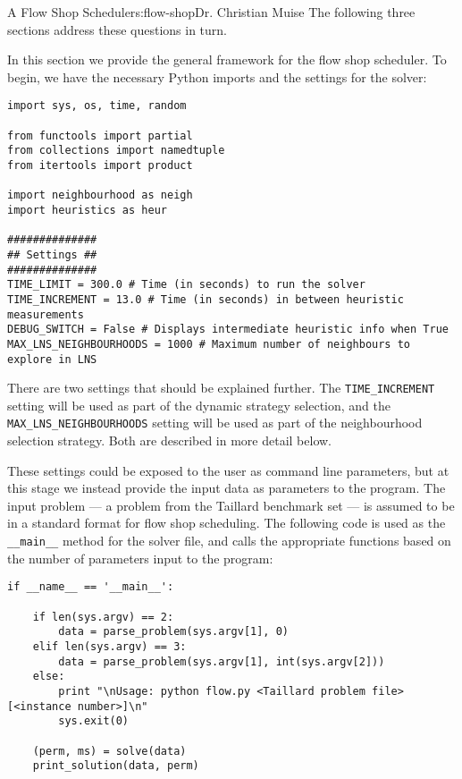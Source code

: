 \begin{aosachapter}{A Flow Shop Scheduler}{s:flow-shop}{Dr. Christian Muise}
The following three sections address these questions in turn.

\label{general-solver}

In this section we provide the general framework for the flow shop
scheduler. To begin, we have the necessary Python imports and the
settings for the solver:

\begin{verbatim}
import sys, os, time, random

from functools import partial
from collections import namedtuple
from itertools import product

import neighbourhood as neigh
import heuristics as heur

##############
## Settings ##
##############
TIME_LIMIT = 300.0 # Time (in seconds) to run the solver
TIME_INCREMENT = 13.0 # Time (in seconds) in between heuristic measurements
DEBUG_SWITCH = False # Displays intermediate heuristic info when True
MAX_LNS_NEIGHBOURHOODS = 1000 # Maximum number of neighbours to explore in LNS
\end{verbatim}

There are two settings that should be explained further. The
\texttt{TIME\_INCREMENT} setting will be used as part of the dynamic
strategy selection, and the \texttt{MAX\_LNS\_NEIGHBOURHOODS} setting
will be used as part of the neighbourhood selection strategy. Both are
described in more detail below.

These settings could be exposed to the user as command line parameters,
but at this stage we instead provide the input data as parameters to the
program. The input problem --- a problem from the Taillard benchmark set
--- is assumed to be in a standard format for flow shop scheduling. The
following code is used as the \texttt{\_\_main\_\_} method for the
solver file, and calls the appropriate functions based on the number of
parameters input to the program:

\begin{verbatim}
if __name__ == '__main__':

    if len(sys.argv) == 2:
        data = parse_problem(sys.argv[1], 0)
    elif len(sys.argv) == 3:
        data = parse_problem(sys.argv[1], int(sys.argv[2]))
    else:
        print "\nUsage: python flow.py <Taillard problem file> [<instance number>]\n"
        sys.exit(0)

    (perm, ms) = solve(data)
    print_solution(data, perm)
\end{verbatim}


\end{aosachapter}
